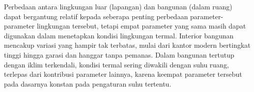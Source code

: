 Perbedaan antara lingkungan luar (lapangan) dan bangunan (dalam ruang) dapat bergantung relatif kepada seberapa penting perbedaan parameter-parameter lingkungan tersebut, tetapi empat parameter yang sama masih dapat digunakan dalam menetapkan kondisi lingkungan termal. Interior bangunan mencakup variasi yang hampir tak terbatas, mulai dari kantor modern bertingkat tinggi hingga garasi dan hanggar tanpa pemanas. Dalam bangunan tertutup dengan iklim terkendali, kondisi termal sering diwakili dengan suhu ruang, terlepas dari kontribusi parameter lainnya, karena keempat parameter tersebut pada dasarnya konstan pada pengaturan suhu tertentu.












